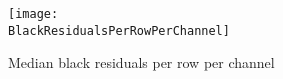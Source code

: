 % 
% 
% 
% 
% 
%
\cleardoublepage

\renewcommand{\slideTitle}{{\Huge {\bf Collateral Data (All Chs)}}}


\begin{figure*}[h!]
  \centering
  \texttt{[image: \\BlackResidualsPerRowPerChannel]}
  \caption{Median black residuals per row per channel}
\end{figure*}

